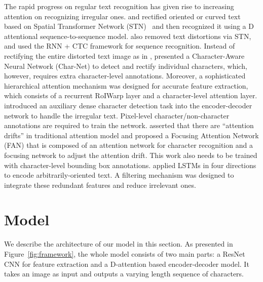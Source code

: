 \documentclass[letterpaper]{article} \usepackage{aaai19}  \usepackage{times}  \usepackage{helvet}  \usepackage{courier}  \usepackage{url}  \usepackage{graphicx}  \usepackage{amsmath}
\begin{document}
The rapid progress on regular text recognition has given rise to increasing attention on recognizing irregular ones.
\cite{shiPAMI2018} and \cite{shiCVPR2016} rectified oriented or curved text based on Spatial Transformer Network (STN)~\cite{jaderberg2015spatial} and
then recognized it using a D attentional sequence-to-sequence model.
\cite{BMVC2016_43} also removed text distortions via STN, and used the RNN + CTC framework for sequence recognition.
Instead of rectifying the entire distorted text image as in \cite{shiPAMI2018,BMVC2016_43}, \cite{Liu2018CharNetAC} presented a Character-Aware Neural Network (Char-Net) to detect and rectify individual characters, which, however, requires extra character-level annotations. Moreover, a sophisticated hierarchical attention mechanism was designed for accurate feature extraction, which consists of a recurrent RoIWarp layer and a character-level attention layer.
\cite{ijcai2017} introduced an auxiliary dense character detection task into the encoder-decoder network to handle the irregular text. Pixel-level character/non-character annotations are required to train the network.
\cite{Cheng2017} asserted that there are ``attention drifts'' in traditional attention model and proposed a Focusing Attention Network (FAN) that is composed of an attention network for character recognition and a focusing network to adjust the attention drift. This work also needs to be trained with character-level bounding box annotations.
\cite{Cheng2018AON} applied LSTMs in four directions to encode arbitrarily-oriented text. A filtering mechanism was designed to integrate these redundant features and reduce irrelevant ones.


\section{Model}
\label{sec:Model}
We describe the architecture of our model in this section. As presented in Figure~\ref{fig:framework}, the whole model consists of two main parts: a ResNet CNN for feature extraction and a D-attention based encoder-decoder model. It takes an image as input and outputs a varying length sequence of characters.
\end{document}
